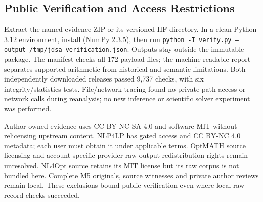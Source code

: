 \subsection{Public Verification and Access Restrictions}
Extract the named evidence ZIP or its versioned HF directory. In a clean Python 3.12 environment, install  (NumPy 2.3.5), then run \texttt{python -I verify.py --output /tmp/jdsa-verification.json}. Outputs stay outside the immutable package. The manifest checks all 172 payload files; the machine-readable report separates supported arithmetic from historical and semantic limitations. Both independently downloaded releases passed 9,737 checks, with six integrity/statistics tests. File/network tracing found no private-path access or network calls during reanalysis; no new inference or scientific solver experiment was performed.

Author-owned evidence uses CC BY-NC-SA 4.0 and software MIT without relicensing upstream content. NLP4LP has gated access and CC BY-NC 4.0 metadata; each user must obtain it under applicable terms. OptMATH source licensing and account-specific provider raw-output redistribution rights remain unresolved. NL4Opt source retains its MIT license but its raw corpus is not bundled here. Complete M5 originals, source witnesses and private author reviews remain local. These exclusions bound public verification even where local raw-record checks succeeded.
